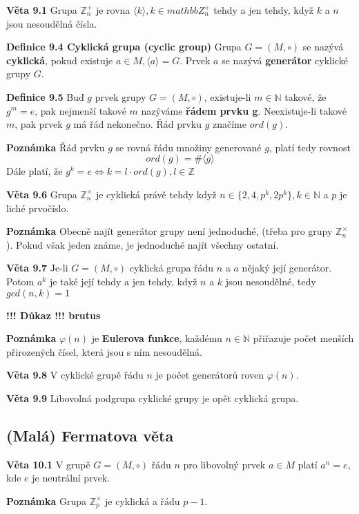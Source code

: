 \documentclass[12pt, letterpaper, twoside]{article}
\begin{document}
\textbf{Věta 9.1} Grupa $\mathbb{Z}^+_n$ je rovna $\langle k \rangle, k \in mathbb{Z}^+_n$
 tehdy a jen tehdy, když $k$ a $n$ jsou nesoudělná čísla.

\textbf{Definice 9.4 Cyklická grupa (cyclic group)} Grupa $G = (M, \circ)$ se nazývá \textbf{cyklická},
 pokud existuje $a \in M, \langle a \rangle = G$. Prvek $a$ se nazývá \textbf{generátor} cyklické grupy $G$.

\textbf{Definice 9.5} Buď $g$ prvek grupy $G = (M, \circ)$, existuje-li $m \in \mathbb{N}$ takové, že $g^m = e$,
 pak nejmenší takové $m$ nazýváme \textbf{řádem prvku g}. Neexistuje-li takové $m$, pak prvek $g$ má řád nekonečno.
 Řád prvku $g$ značíme $ord(g)$.

\textbf{Poznámka} Řád prvku $g$ se rovná řádu množiny generované $g$, platí tedy rovnost
\[ord(g) = \#\langle g \rangle\]
Dále platí, že $ g^k = e \Leftrightarrow k = l \cdot ord(g), l \in \mathbb{Z}$

\textbf{Věta 9.6} Grupa $\mathbb{Z}^{\times}_{n}$ je cyklická právě tehdy když $n \in \{2, 4, p^k, 2p^k\}, k \in \mathbb{N}$
 a $p$ je liché prvočíslo.

\textbf{Poznámka} Obecně najít generátor grupy není jednoduché, (třeba pro grupy $\mathbb{Z}^{\times}_{n}$).
 Pokud však jeden známe, je jednoduché najít všechny ostatní.

\textbf{Věta 9.7} Je-li $G = (M, \circ)$ cyklická grupa řádu $n$ a $a$ nějaký její generátor.
 Potom $a^k$ je také její tehdy a jen tehdy, když $n$ a $k$ jsou nesoudělné, tedy $gcd(n,k) = 1$

\textbf{!!! Důkaz !!! brutus}

\textbf{Poznámka} $\varphi(n)$ je \textbf{Eulerova funkce},
 každému $n \in \mathbb{N}$ přiřazuje počet menších přirozených čísel, která jsou s ním nesoudělná.

\textbf{Věta 9.8} V cyklické grupě řádu $n$ je počet generátorů roven $\varphi(n)$.

\textbf{Věta 9.9} Libovolná podgrupa cyklické grupy je opět cyklická grupa.

\subsection{(Malá) Fermatova věta}

\textbf{Věta 10.1} V grupě $G = (M, \circ)$ řádu $n$ pro libovolný prvek $a \in M$ platí
 $a^n = e$, kde $e$ je neutrální prvek. 

\textbf{Poznámka} Grupa $ \mathbb{Z}^{\times}_{p}$ je cyklická a řádu $p - 1$.
\end{document}
